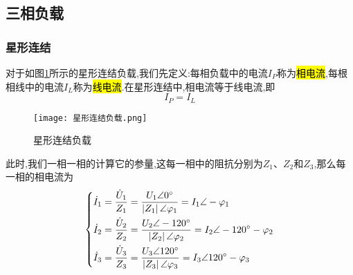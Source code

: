 \subsection{\K 三相负载}

\subsubsection{\K 星形连结}
\Par 对于如图\ref{fig:星形连结负载}所示的星形连结负载,我们先定义:每相负载中的电流$I_P$称为\hl{相电流},每根相线中的电流$I_L$称为\hl{线电流}.在星形连结中,相电流等于线电流,即
\begin{equation}
    I_P=I_L
\end{equation}

\begin{figure}[htbp]
	\centering
	\texttt{[image: 星形连结负载.png]}
	\caption{星形连结负载}
	\label{fig:星形连结负载}
\end{figure}

此时,我们一相一相的计算它的参量,这每一相中的阻抗分别为$Z_1$、$Z_2$和$Z_3$,那么每一相的相电流为
\begin{equation*}
    \left\{ \begin{aligned}
        \dot{I}_1&=\frac{\dot{U}_1}{Z_1}=\frac{U_1\angle 0^{\circ }}{\left| Z_1 \right|\angle \varphi _1}=I_1\angle -\varphi _1\\
        \dot{I}_2&=\frac{\dot{U}_2}{Z_2}=\frac{U_2\angle -120^{\circ }}{\left| Z_2 \right|\angle \varphi _2}=I_2\angle -120^{\circ }-\varphi _2\\
        \dot{I}_3&=\frac{\dot{U}_3}{Z_3}=\frac{U_3\angle 120^{\circ }}{\left| Z_3 \right|\angle \varphi _3}=I_3\angle 120^{\circ }-\varphi _3\\
    \end{aligned} \right. 
\end{equation*}

